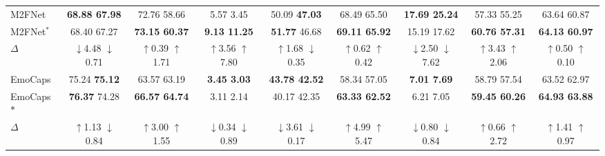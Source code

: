 {{\begin{table*}[!t]
{\begin{tabular}{l|cccccccc}
			M2FNet \cite{chudasama2022m2fnet} & \textbf{68.88 67.98} & 72.76 58.66 & 5.57 3.45 & 50.09 \textbf{47.03} & {68.49 65.50} & \textbf{17.69 25.24} &  57.33 55.25&63.64 60.87\\
			\rowcolor{gray!30}
			M2FNet$^\ast$ & {68.40 67.27} & \textbf{73.15 60.37} & \textbf{9.13 11.25} & \textbf{51.77} 46.68 & \textbf{69.11 65.92} & 15.19 17.62 & \textbf{60.76 57.31} & \textbf{64.13 60.97}\\ 
			$\Delta$ & \textcolor[rgb]{0.2,0.2,0.2}{$\downarrow$4.48} \textcolor[rgb]{0.2,0.2,0.2}{$\downarrow$0.71} & \textcolor[rgb]{0.0,0.6,0.0}{$\uparrow$0.39} \textcolor[rgb]{0.0,0.6,0.0}{$\uparrow$1.71} & \textcolor[rgb]{0.0,0.6,0.0}{$\uparrow$3.56} \textcolor[rgb]{0.0,0.6,0.0}{$\uparrow$7.80} & \textcolor[rgb]{0.0,0.6,0.0}{$\uparrow$1.68} \textcolor[rgb]{0.2,0.2,0.2}{$\downarrow$0.35} & \textcolor[rgb]{0.0,0.6,0.0}{$\uparrow$0.62} \textcolor[rgb]{0.0,0.6,0.0}{$\uparrow$0.42} & \textcolor[rgb]{0.2,0.2,0.2}{$\downarrow$2.50} \textcolor[rgb]{0.2,0.2,0.2}{$\downarrow$7.62} & \textcolor[rgb]{0.0,0.6,0.0}{$\uparrow$3.43} \textcolor[rgb]{0.0,0.6,0.0}{$\uparrow$2.06} & \textcolor[rgb]{0.0,0.6,0.0}{$\uparrow$0.50} \textcolor[rgb]{0.0,0.6,0.0}{$\uparrow$0.10}  \\ \hline
			
			EmoCaps \cite{li2022emocaps} & 75.24 {\textbf{75.12}} & {63.57 63.19} & \textbf{3.45 3.03} & {\textbf{43.78 42.52}} & 58.34 57.05 & {\textbf{7.01 7.69}} & 58.79 57.54 & 63.52 62.97 \\
			\rowcolor{gray!30}
			EmoCaps$\ast$ & \textbf{76.37}  74.28 & {\textbf{66.57  64.74}}  & 3.11  2.14 & {40.17  42.35} & \textbf{63.33  62.52} & {6.21  7.05} & \textbf{59.45  60.26} & \textbf{64.93  63.88}\\ 
			$\Delta$ & \textcolor[rgb]{0.0,0.6,0.0}{$\uparrow$1.13} \textcolor[rgb]{0.2,0.2,0.2}{$\downarrow$0.84} & \textcolor[rgb]{0.0,0.6,0.0}{$\uparrow$3.00} \textcolor[rgb]{0.0,0.6,0.0}{$\uparrow$1.55} & \textcolor[rgb]{0.2,0.2,0.2}{$\downarrow$0.34} \textcolor[rgb]{0.2,0.2,0.2}{$\downarrow$0.89} & \textcolor[rgb]{0.2,0.2,0.2}{$\downarrow$3.61} \textcolor[rgb]{0.2,0.2,0.2}{$\downarrow$0.17} & \textcolor[rgb]{0.0,0.6,0.0}{$\uparrow$4.99} \textcolor[rgb]{0.0,0.6,0.0}{$\uparrow$5.47} & \textcolor[rgb]{0.2,0.2,0.2}{$\downarrow$0.80} \textcolor[rgb]{0.2,0.2,0.2}{$\downarrow$0.84} & \textcolor[rgb]{0.0,0.6,0.0}{$\uparrow$0.66} \textcolor[rgb]{0.0,0.6,0.0}{$\uparrow$2.72} & \textcolor[rgb]{0.0,0.6,0.0}{$\uparrow$1.41} \textcolor[rgb]{0.0,0.6,0.0}{$\uparrow$0.97}  \\ \hline
	\end{tabular}}
\end{table*}

}}
